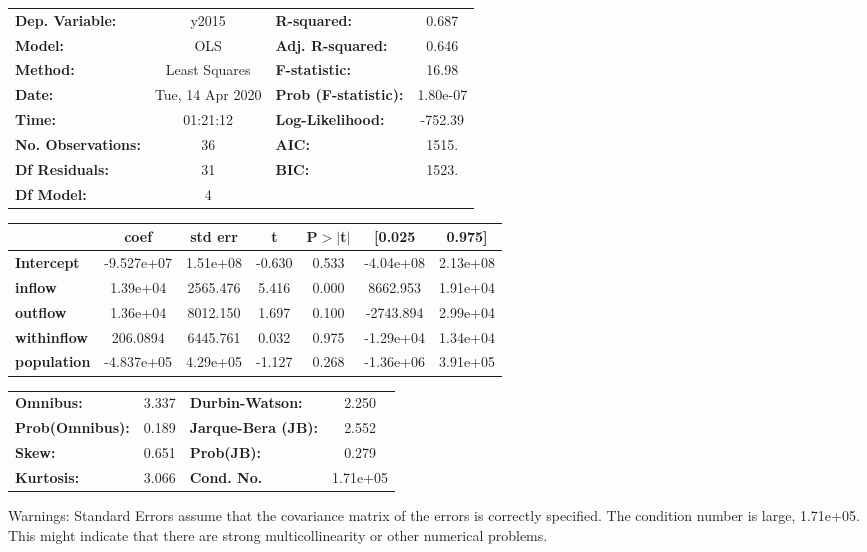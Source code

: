 \begin{center}
\begin{tabular}{lclc}
\toprule
\textbf{Dep. Variable:}    &      y2015       & \textbf{  R-squared:         } &     0.687   \\
\textbf{Model:}            &       OLS        & \textbf{  Adj. R-squared:    } &     0.646   \\
\textbf{Method:}           &  Least Squares   & \textbf{  F-statistic:       } &     16.98   \\
\textbf{Date:}             & Tue, 14 Apr 2020 & \textbf{  Prob (F-statistic):} &  1.80e-07   \\
\textbf{Time:}             &     01:21:12     & \textbf{  Log-Likelihood:    } &   -752.39   \\
\textbf{No. Observations:} &          36      & \textbf{  AIC:               } &     1515.   \\
\textbf{Df Residuals:}     &          31      & \textbf{  BIC:               } &     1523.   \\
\textbf{Df Model:}         &           4      & \textbf{                     } &             \\
\bottomrule
\end{tabular}
\begin{tabular}{lcccccc}
                    & \textbf{coef} & \textbf{std err} & \textbf{t} & \textbf{P$> |$t$|$} & \textbf{[0.025} & \textbf{0.975]}  \\
\midrule
\textbf{Intercept}  &   -9.527e+07  &     1.51e+08     &    -0.630  &         0.533        &    -4.04e+08    &     2.13e+08     \\
\textbf{inflow}     &     1.39e+04  &     2565.476     &     5.416  &         0.000        &     8662.953    &     1.91e+04     \\
\textbf{outflow}    &     1.36e+04  &     8012.150     &     1.697  &         0.100        &    -2743.894    &     2.99e+04     \\
\textbf{withinflow} &     206.0894  &     6445.761     &     0.032  &         0.975        &    -1.29e+04    &     1.34e+04     \\
\textbf{population} &   -4.837e+05  &     4.29e+05     &    -1.127  &         0.268        &    -1.36e+06    &     3.91e+05     \\
\bottomrule
\end{tabular}
\begin{tabular}{lclc}
\textbf{Omnibus:}       &  3.337 & \textbf{  Durbin-Watson:     } &    2.250  \\
\textbf{Prob(Omnibus):} &  0.189 & \textbf{  Jarque-Bera (JB):  } &    2.552  \\
\textbf{Skew:}          &  0.651 & \textbf{  Prob(JB):          } &    0.279  \\
\textbf{Kurtosis:}      &  3.066 & \textbf{  Cond. No.          } & 1.71e+05  \\
\bottomrule
\end{tabular}
\end{center}

Warnings: \newline
 [1] Standard Errors assume that the covariance matrix of the errors is correctly specified. \newline
 [2] The condition number is large, 1.71e+05. This might indicate that there are \newline
 strong multicollinearity or other numerical problems.